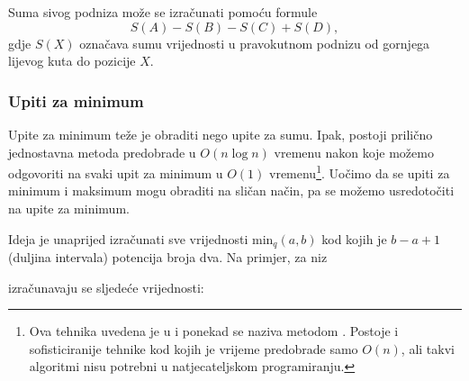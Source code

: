 Suma sivog podniza može se izračunati
pomoću formule
\[S(A) - S(B) - S(C) + S(D),\]
gdje $S(X)$ označava sumu vrijednosti
u pravokutnom
podnizu od gornjega lijevog kuta
do pozicije $X$.

\subsubsection{Upiti za minimum}


Upite za minimum teže je obraditi
nego upite za sumu.
Ipak, postoji prilično jednostavna 
metoda predobrade u $O(n \log n)$ vremenu
nakon koje možemo odgovoriti na svaki upit
za minimum u $O(1)$ vremenu\footnote{Ova tehnika
uvedena je u \cite{ben00} i ponekad se
naziva metodom .
Postoje i sofisticiranije tehnike \cite{fis06} kod kojih
je vrijeme predobrade samo $O(n)$, ali takvi algoritmi
nisu potrebni u natjecateljskom programiranju.}.
Uočimo da se upiti za minimum i maksimum mogu
obraditi na sličan način,
pa se možemo usredotočiti na upite za minimum.

Ideja je unaprijed izračunati sve vrijednosti
$\textrm{min}_q(a,b)$ kod kojih je
$b-a+1$ (duljina intervala) potencija broja dva.
Na primjer, za niz

\begin{center}
\end{center}
izračunavaju se sljedeće vrijednosti:

